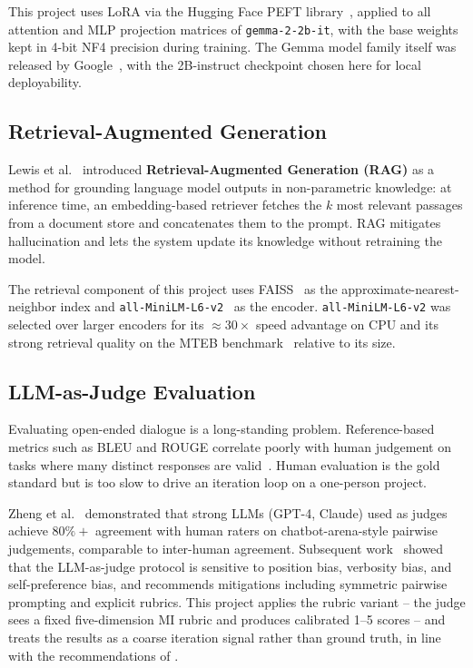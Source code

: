 This project uses LoRA via the Hugging Face PEFT library~\cite{peft2023}, applied
to all attention and MLP projection matrices of \texttt{gemma-2-2b-it}, with the
base weights kept in 4-bit NF4 precision during training. The Gemma model
family itself was released by Google~\cite{gemma2024}, with the 2B-instruct
checkpoint chosen here for local deployability.

\subsection{Retrieval-Augmented Generation}

Lewis et al.~\cite{lewis2020rag} introduced \textbf{Retrieval-Augmented Generation
(RAG)} as a method for grounding language model outputs in non-parametric
knowledge: at inference time, an embedding-based retriever fetches the
$k$ most relevant passages from a document store and concatenates them to the
prompt. RAG mitigates hallucination and lets the system update its knowledge
without retraining the model.

The retrieval component of this project uses FAISS~\cite{johnson2019faiss} as
the approximate-nearest-neighbor index and \texttt{all-MiniLM-L6-v2}~\cite{reimers2019sentencebert}
as the encoder. \texttt{all-MiniLM-L6-v2} was selected over larger encoders for
its $\approx 30 \times$ speed advantage on CPU and its strong retrieval quality
on the MTEB benchmark~\cite{muennighoff2022mteb} relative to its size.

\subsection{LLM-as-Judge Evaluation}

Evaluating open-ended dialogue is a long-standing problem. Reference-based
metrics such as BLEU and ROUGE correlate poorly with human judgement on tasks
where many distinct responses are valid~\cite{liu2016how}. Human evaluation is
the gold standard but is too slow to drive an iteration loop on a one-person
project.

Zheng et al.~\cite{zheng2023judging} demonstrated that strong LLMs (GPT-4,
Claude) used as judges achieve $80\%+$ agreement with human raters on
chatbot-arena-style pairwise judgements, comparable to inter-human agreement.
Subsequent work~\cite{chiang2023closer} showed that the LLM-as-judge protocol
is sensitive to position bias, verbosity bias, and self-preference bias, and
recommends mitigations including symmetric pairwise prompting and explicit
rubrics. This project applies the rubric variant -- the judge sees a fixed
five-dimension MI rubric and produces calibrated 1--5 scores -- and treats the
results as a coarse iteration signal rather than ground truth, in line with
the recommendations of \cite{chiang2023closer}.

